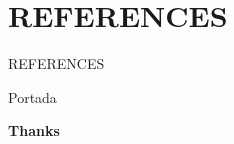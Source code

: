 \nocite{*} %
\section*{REFERENCES}
\begin{frame}{REFERENCES} %
\begingroup %
\renewcommand{\color}[1]{} %
\small{} %

\endgroup %
\end{frame}
\begin{frame} %
	\begin{beamercolorbox}[ht=\paperheight,wd=\paperwidth, center]{Portada}
		\begin{center}\Huge\textbf{Thanks}\end{center} %
		\vspace{0.45\paperheight}
    \end{beamercolorbox}
\end{frame}
